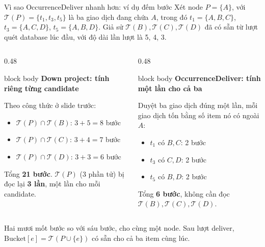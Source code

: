 \documentclass[9pt, aspectratio=169]{beamer}
\newenvironment{quietblock}[1]{%
  \begin{beamercolorbox}[wd=\linewidth,sep=5pt,rounded=true]{block body}
  {\color{psdearblue}\bfseries #1}\par\vspace{2pt}\footnotesize
}{%
  \end{beamercolorbox}
}
\begin{document}
\begin{frame}{Vì sao OccurrenceDeliver nhanh hơn: ví dụ đếm bước}
  \small
  Xét node $P=\{A\}$, với $\mathcal T(P)=\{t_1,t_3,t_5\}$ là ba giao dịch
  đang chứa $A$, trong đó $t_1=\{A,B,C\}$, $t_3=\{A,C,D\}$, $t_5=\{A,B,D\}$.
  Giả sử $\mathcal T(B),\mathcal T(C),\mathcal T(D)$ đã có sẵn từ lượt quét
  database lúc đầu, với độ dài lần lượt là 5, 4, 3.
  \begin{columns}[T,onlytextwidth]
    \begin{column}{0.48\textwidth}
      \begin{quietblock}{Down project: tính riêng từng candidate}
        Theo công thức ở slide trước:
        \begin{itemize}
          \item $\mathcal T(P)\cap\mathcal T(B)$: $3+5=8$ bước
          \item $\mathcal T(P)\cap\mathcal T(C)$: $3+4=7$ bước
          \item $\mathcal T(P)\cap\mathcal T(D)$: $3+3=6$ bước
        \end{itemize}
        Tổng \textbf{21 bước}. $\mathcal T(P)$ (3 phần tử) bị đọc lại
        \textbf{3 lần}, một lần cho mỗi candidate.
      \end{quietblock}
    \end{column}

    \begin{column}{0.48\textwidth}
      \begin{quietblock}{OccurrenceDeliver: tính một lần cho cả ba}
        Duyệt ba giao dịch đúng một lần, mỗi giao dịch tốn bằng số item nó
        có ngoài $A$:
        \begin{itemize}
          \item $t_1$ có $B,C$: 2 bước
          \item $t_3$ có $C,D$: 2 bước
          \item $t_5$ có $B,D$: 2 bước
        \end{itemize}
        Tổng \textbf{6 bước}, không cần đọc $\mathcal T(B),\mathcal
        T(C),\mathcal T(D)$.
      \end{quietblock}
    \end{column}
  \end{columns}

  \vspace{0.2cm}
  {\small\color{psdeargray}\centering Hai mươi mốt bước so với sáu bước,
  cho cùng một node. Sau lượt deliver, $\mathrm{Bucket}[e]=\mathcal
  T(P\cup\{e\})$ có sẵn cho cả ba item cùng lúc.\par}
\end{frame}
\end{document}
